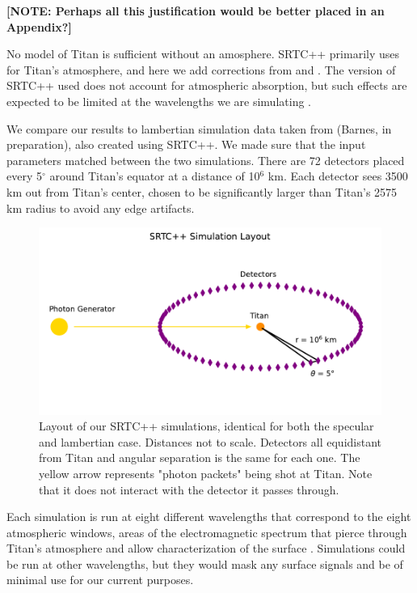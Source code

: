 \documentclass[twocolumn,linenumbers]{aastex631}
\begin{document}
\textbf{\color{red} [NOTE: Perhaps all this justification would be better placed in an Appendix?] \color{black}}

No model of Titan is sufficient without an amosphere. SRTC++ primarily uses \cite{Tomasko2008} for Titan's atmosphere, and here we add corrections from \cite{Hirtzig2013} and \cite{Rodriguez2018}. The version of SRTC++ used does not account for atmospheric absorption, but such effects are expected to be limited at the wavelengths we are simulating \citep{EsSayeh2023}.

We compare our results to lambertian simulation data taken from (Barnes, in preparation), also created using SRTC++. We made sure that the input parameters matched between the two simulations. There are 72 detectors placed every 5$^{\circ}$ around Titan's equator at a distance of 10$^6$ km. Each detector sees 3500 km out from Titan's center, chosen to be significantly larger than Titan's 2575 km radius to avoid any edge artifacts.

\begin{figure}[htbp]
\includegraphics[scale = 0.5]{SRTCLayout.pdf}
\centering
\caption{Layout of our SRTC++ simulations, identical for both the specular and lambertian case. Distances not to scale. Detectors all equidistant from Titan and angular separation is the same for each one. The yellow arrow represents "photon packets" being shot at Titan. Note that it does not interact with the detector it passes through.}
\label{fig:5}
\end{figure}

Each simulation is run at eight different wavelengths that correspond to the eight atmospheric windows, areas of the electromagnetic spectrum that pierce through Titan's atmosphere and allow characterization of the surface \citep{Barnes2007}. Simulations could be run at other wavelengths, but they would mask any surface signals and be of minimal use for our current purposes. 
\end{document}
